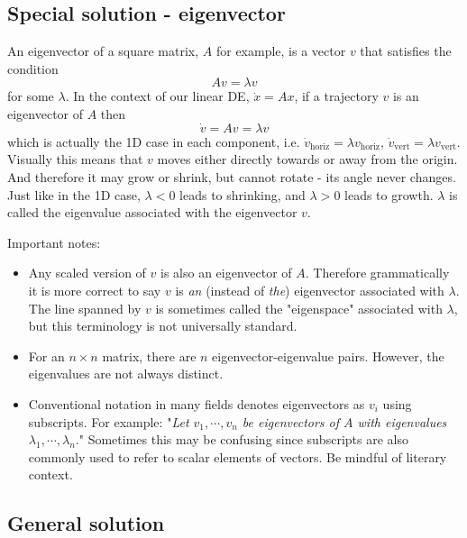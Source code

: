 \documentclass[11pt, oneside]{article}   	%
\begin{document}
\subsection*{Special solution - eigenvector}

An eigenvector of a square matrix, $A$ for example, is a vector $v$ that satisfies the condition
\begin{equation}
Av = \lambda v
\end{equation}
for some $\lambda$.
In the context of our linear DE, $\dot{x} = Ax$, if a trajectory $v$ is an eigenvector of $A$ then
\begin{equation}
\dot{v} = Av = \lambda v
\end{equation}
which is actually the 1D case in each component,
i.e. $\dot{v}_\mathrm{horiz} = \lambda v_\mathrm{horiz}$, $\dot{v}_\mathrm{vert} = \lambda v_\mathrm{vert}$.
Visually this means that $v$ moves either directly towards or away from the origin.
And therefore it may grow or shrink, but cannot rotate - its angle never changes.
Just like in the 1D case, $\lambda < 0$ leads to shrinking, and $\lambda > 0$ leads to growth.
$\lambda$ is called the eigenvalue associated with the eigenvector $v$.

Important notes:
\begin{itemize}
\item Any scaled version of $v$ is also an eigenvector of $A$.
Therefore grammatically it is more correct to say $v$ is \textit{an} (instead of \textit{the}) eigenvector associated with $\lambda$.
The line spanned by $v$ is sometimes called the "eigenspace" associated with $\lambda$, but this terminology is not universally standard.
\item For an $n\times n$ matrix, there are $n$ eigenvector-eigenvalue pairs. However, the eigenvalues are not always distinct.
\item Conventional notation in many fields denotes eigenvectors as $v_i$ using subscripts.
For example: "\textit{Let $ v_1,\cdots,v_n $ be eigenvectors of $A$ with eigenvalues $ \lambda_1,\cdots,\lambda_n $}."
Sometimes this may be confusing since subscripts are also commonly used to refer to scalar elements of vectors.
Be mindful of literary context.
\end{itemize}

\subsection*{General solution}
\end{document}
